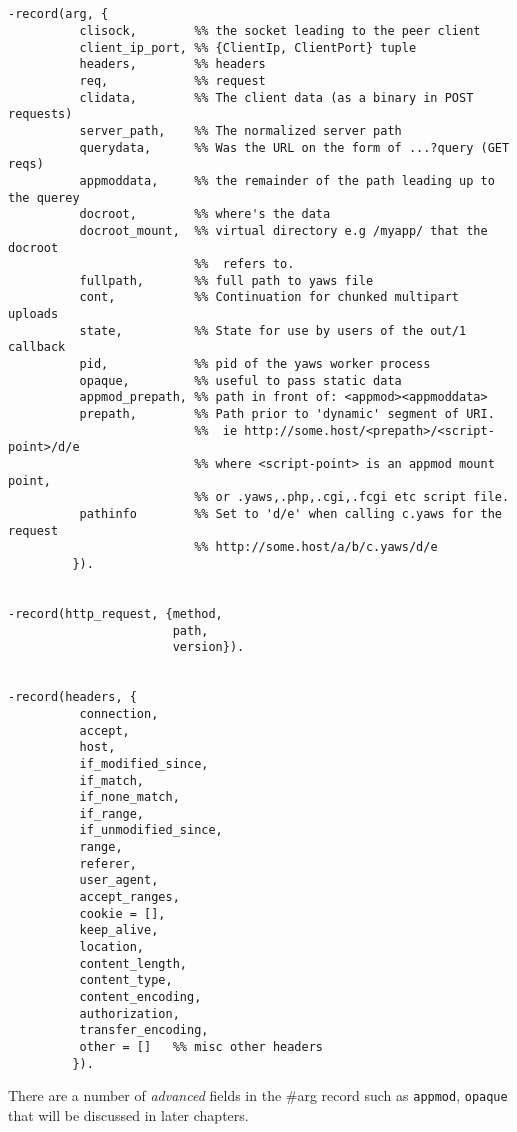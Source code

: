 \documentclass[11pt,oneside,english]{book}
\begin{document}
\begin{verbatim}


-record(arg, {
          clisock,        %% the socket leading to the peer client
          client_ip_port, %% {ClientIp, ClientPort} tuple
          headers,        %% headers
          req,            %% request
          clidata,        %% The client data (as a binary in POST requests)
          server_path,    %% The normalized server path
          querydata,      %% Was the URL on the form of ...?query (GET reqs)
          appmoddata,     %% the remainder of the path leading up to the querey
          docroot,        %% where's the data
          docroot_mount,  %% virtual directory e.g /myapp/ that the docroot
                          %%  refers to.
          fullpath,       %% full path to yaws file
          cont,           %% Continuation for chunked multipart uploads
          state,          %% State for use by users of the out/1 callback
          pid,            %% pid of the yaws worker process
          opaque,         %% useful to pass static data
          appmod_prepath, %% path in front of: <appmod><appmoddata>
          prepath,        %% Path prior to 'dynamic' segment of URI. 
                          %%  ie http://some.host/<prepath>/<script-point>/d/e 
                          %% where <script-point> is an appmod mount point, 
                          %% or .yaws,.php,.cgi,.fcgi etc script file.
          pathinfo        %% Set to 'd/e' when calling c.yaws for the request
                          %% http://some.host/a/b/c.yaws/d/e
         }).


-record(http_request, {method,
                       path,
                       version}).


-record(headers, {
          connection,
          accept,
          host,
          if_modified_since,
          if_match,
          if_none_match,
          if_range,
          if_unmodified_since,
          range,
          referer,
          user_agent,
          accept_ranges,
          cookie = [],
          keep_alive,
          location,
          content_length,
          content_type,
          content_encoding,
          authorization,
          transfer_encoding,
          other = []   %% misc other headers
         }).

\end{verbatim}


There are a number of \textit{advanced} fields in the \#arg record
such as \verb+appmod+, \verb+opaque+ that will be discussed in later chapters.
\end{document}
